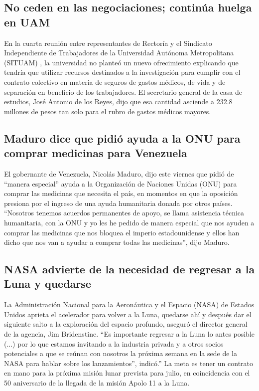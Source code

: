 \documentclass{mylib/reporte}
\begin{document}
\subsection{No ceden en las negociaciones; continúa huelga en UAM}
En la cuarta reunión entre representantes de Rectoría y el Sindicato Independiente de Trabajadores de la Universidad Autónoma Metropolitana (SITUAM) , la universidad no planteó un nuevo ofrecimiento explicando que tendría que utilizar recursos destinados a la investigación para cumplir con el contrato colectivo en materia de seguros de gastos médicos, de vida y de separación en beneficio de los trabajadores.
El secretario general de la casa de estudios, José Antonio de los Reyes, dijo que esa cantidad asciende a 232.8 millones de pesos tan solo para el rubro de gastos médicos mayores.

\subsection{Maduro dice que pidió ayuda a la ONU para comprar medicinas para Venezuela}
El gobernante de Venezuela, Nicolás Maduro, dijo este viernes que pidió de “manera especial” ayuda a la Organización de Naciones Unidas (ONU) para comprar las medicinas que necesita el país, en momentos en que la oposición presiona por el ingreso de una ayuda humanitaria donada por otros países.
“Nosotros tenemos acuerdos permanentes de apoyo, se llama asistencia técnica humanitaria, con la ONU y yo les he pedido de manera especial que nos ayuden a comprar las medicinas que nos bloquea el imperio estadounidense y ellos han dicho que nos van a ayudar a comprar todas las medicinas”, dijo Maduro.

\subsection{NASA advierte de la necesidad de regresar a la Luna y quedarse}

La Administración Nacional para la Aeronáutica y el Espacio (NASA) de Estados Unidos aprieta el acelerador para volver a la Luna, quedarse ahí y después dar el siguiente salto a la exploración del espacio profundo, aseguró el director general de la agencia, Jim Bridenstine.
“Es importante regresar a la Luna lo antes posible (...) por lo que estamos invitando a la industria privada y a otros socios potenciales a que se reúnan con nosotros la próxima semana en la sede de la NASA para hablar sobre los lanzamientos”, indicó.”
La meta es tener un contrato en mano para la próxima misión lunar prevista para julio, en coincidencia con el 50 aniversario de la llegada de la misión Apolo 11 a la Luna.
\end{document}
